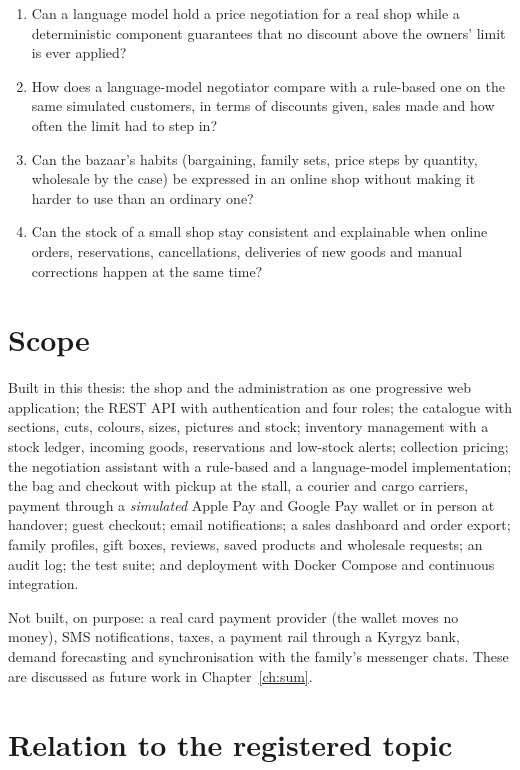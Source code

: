 \begin{enumerate}[\bfseries RQ1.]
	\item Can a language model hold a price negotiation for a real shop while a deterministic component guarantees that
	no discount above the owners' limit is ever applied?
	\item How does a language-model negotiator compare with a rule-based one on the same simulated customers, in terms of
	discounts given, sales made and how often the limit had to step in?
	\item Can the bazaar's habits (bargaining, family sets, price steps by quantity, wholesale by the case) be expressed
	in an online shop without making it harder to use than an ordinary one?
	\item Can the stock of a small shop stay consistent and explainable when online orders, reservations, cancellations,
	deliveries of new goods and manual corrections happen at the same time?
\end{enumerate}

\section{Scope}

Built in this thesis: the shop and the administration as one progressive web application; the REST API with
authentication and four roles; the catalogue with sections, cuts, colours, sizes, pictures and stock; inventory
management with a stock ledger, incoming goods, reservations and low-stock alerts; collection pricing; the negotiation
assistant with a rule-based and a language-model implementation; the bag and checkout with pickup at the stall, a
courier and cargo carriers, payment through a \emph{simulated} Apple Pay and Google Pay wallet or in person at
handover; guest checkout; email notifications; a sales dashboard and order export; family profiles, gift boxes,
reviews, saved products and wholesale requests; an audit log; the test suite; and deployment with Docker Compose and
continuous integration.

Not built, on purpose: a real card payment provider (the wallet moves no money), SMS notifications, taxes, a payment
rail through a Kyrgyz bank, demand forecasting and synchronisation with the family's messenger chats. These are
discussed as future work in Chapter~\ref{ch:sum}.

\section{Relation to the registered topic}
\label{sec:registered}

